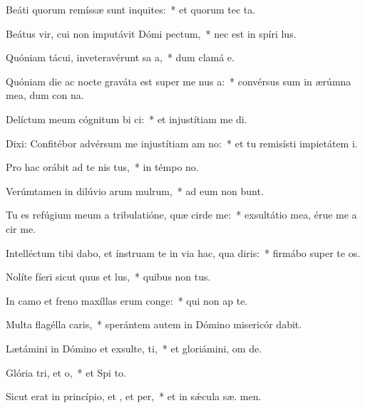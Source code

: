 \item Beáti quorum remíssæ sunt inquites:~* et quorum tec  ta.
\item Beátus vir, cui non imputávit Dómi pectum,~* nec est in spíri  lus.
\item Quóniam tácui, inveteravérunt sa a,~* dum clamá  e.
\item Quóniam die ac nocte graváta est super me nus a:~* convérsus sum in ærúmna mea, dum con na.
\item Delíctum meum cógnitum bi ci:~* et injustítiam me  di.
\item Dixi: Confitébor advérsum me injustítiam am no:~* et tu remisísti impietátem  i.
\item Pro hac orábit ad te nis tus,~* in témpo no.
\item Verúmtamen in dilúvio arum mulrum,~* ad eum non bunt.
\item Tu es refúgium meum a tribulatióne, quæ cirde me:~* exsultátio mea, érue me a cir me.
\item Intelléctum tibi dabo, et ínstruam te in via hac, qua diris:~* firmábo super te  os.
\item Nolíte fíeri sicut quus et lus,~* quibus non  tus.
\item In camo et freno maxíllas erum conge:~* qui non ap  te.
\item Multa flagélla caris,~* sperántem autem in Dómino misericór dabit.
\item Lætámini in Dómino et exsulte, ti,~* et gloriámini, om  de.
\item Glória tri, et o,~* et Spi to.
\item Sicut erat in princípio, et , et per,~* et in sǽcula sæ. men.

